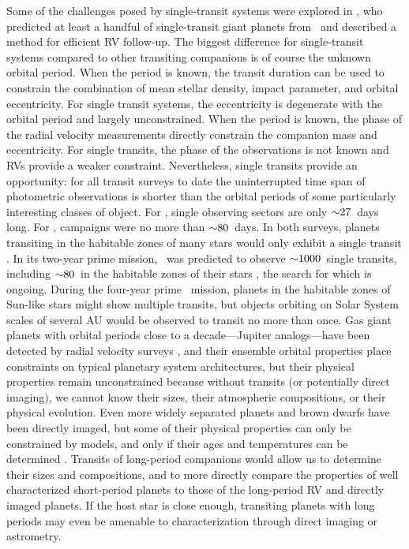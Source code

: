 \documentclass[twocolumn]{aastex63}
\begin{document}
Some of the challenges posed by single-transit systems were explored in \citet{yee:2008}, who predicted at least a handful of single-transit giant planets from \kep\ and described a method for efficient RV follow-up. The biggest difference for single-transit systems compared to other transiting companions is of course the unknown orbital period. When the period is known, the transit duration can be used to constrain the combination of mean stellar density, impact parameter, and orbital eccentricity. For single transit systems, the eccentricity is degenerate with the orbital period and largely unconstrained. When the period is known, the phase of the radial velocity measurements directly constrain the companion mass and eccentricity. For single transits, the phase of the observations is not known and RVs provide a weaker constraint. Nevertheless, single transits provide an opportunity: for all transit surveys to date the uninterrupted time span of photometric observations is shorter than the orbital periods of some particularly interesting classes of object. For \tess, single observing sectors are only $\mathord{\sim}27$\ days long. For \ktwo, campaigns were no more than $\mathord{\sim} 80$\ days. In both surveys, planets transiting in the habitable zones of many stars would only exhibit a single transit \citep[see, e.g.,][]{vanderburg:2018}. In its two-year prime mission, \tess\ was predicted to observe $\mathord{\sim} 1000$\ single transits, including $\mathord{\sim} 80$\ in the habitable zones of their stars \citep{villanueva:2019}, the search for which is ongoing. During the four-year prime \kep\ mission, planets in the habitable zones of Sun-like stars might show multiple transits, but objects orbiting on Solar System scales of several AU would be observed to transit no more than once. Gas giant planets with orbital periods close to a decade---Jupiter analogs---have been detected by radial velocity surveys \citep[e.g.,][]{wittenmyer:2020,rosenthal:2021}, and their ensemble orbital properties place constraints on typical planetary system architectures, but their physical properties remain unconstrained because without transits (or potentially direct imaging), we cannot know their sizes, their atmospheric compositions, or their physical evolution. Even more widely separated planets and brown dwarfs have been directly imaged, but some of their physical properties can only be constrained by models, and only if their ages and temperatures can be determined \citep[see, e.g.,][]{jones:2016}. Transits of long-period companions would allow us to determine their sizes and compositions, and to more directly compare the properties of well characterized short-period planets to those of the long-period RV and directly imaged planets. If the host star is close enough, transiting planets with long periods may even be amenable to characterization through direct imaging or astrometry.
\end{document}
